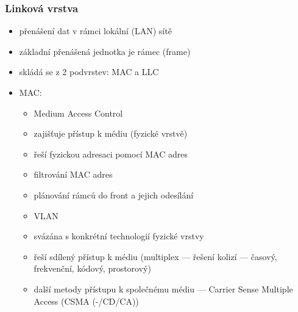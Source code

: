 \subsubsection*{Linková vrstva}
\begin{itemize}
	\item přenášení dat v rámci lokální (LAN) sítě
	\item základní přenášená jednotka je rámec (frame)
	\item skládá se z 2 podvrstev: MAC a LLC
	\item MAC:
	\begin{itemize}
		\item Medium Access Control
		\item zajišťuje přístup k médiu (fyzické vrstvě)
		\item řeší fyzickou adresaci pomocí MAC adres
		\item filtrování MAC adres
		\item plánování rámců do front  a jejich odesílání
		\item VLAN
		\item svázána s konkrétní technologií fyzické vrstvy
		\item řeší sdílený přístup k médiu (multiplex --- řešení kolizí --- časový, frekvenční, kódový, prostorový)
		\item další metody přístupu k společnému médiu --- Carrier Sense Multiple Access (CSMA (-/CD/CA))
		

\end{itemize}
\end{itemize}
